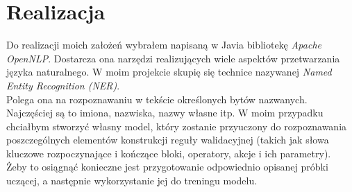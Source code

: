 \section{Realizacja}
Do realizacji moich założeń wybrałem napisaną w Javia bibliotekę \textit{Apache OpenNLP}. Dostarcza ona narzędzi realizujących wiele aspektów przetwarzania języka naturalnego.
W moim projekcie skupię się technice nazywanej \textit{Named Entity Recognition (NER)}. 
\\
Polega ona na rozpoznawaniu w tekście określonych bytów nazwanych. Najczęściej są to imiona, nazwiska, nazwy własne itp.  W moim przypadku chciałbym stworzyć własny model, który zostanie przyuczony do rozpoznawania poszczególnych elementów konstrukcji reguły walidacyjnej (takich jak słowa kluczowe rozpoczynające i kończące bloki, operatory, akcje i ich parametry). 
\\
Żeby to osiągnąć konieczne jest przygotowanie odpowiednio opisanej próbki uczącej, a następnie wykorzystanie jej do treningu modelu.
